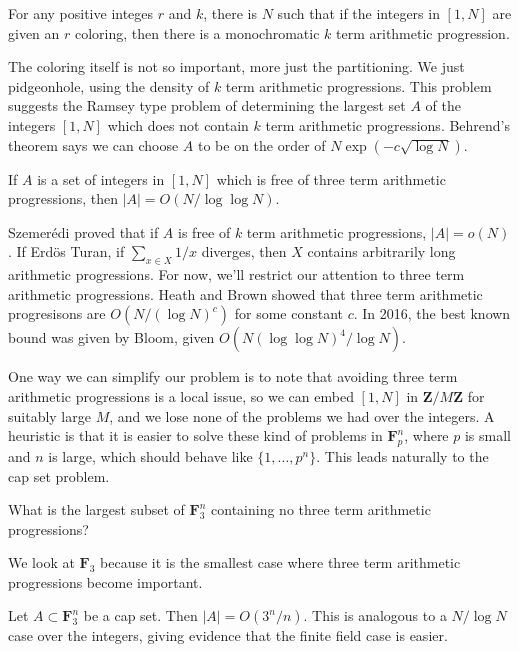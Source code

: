 \begin{theorem}
	For any positive integes $r$ and $k$, there is $N$ such that if the integers in $[1,N]$ are given an $r$ coloring, then there is a monochromatic $k$ term arithmetic progression.
\end{theorem}

The coloring itself is not so important, more just the partitioning. We just pidgeonhole, using the density of $k$ term arithmetic progressions. This problem suggests the Ramsey type problem of determining the largest set $A$ of the integers $[1,N]$ which does not contain $k$ term arithmetic progressions. Behrend's theorem says we can choose $A$ to be on the order of $N\exp(-c \sqrt{\log N})$.

\begin{theorem}[Roth - 1956] If $A$ is a set of integers in $[1,N]$ which is free of three term arithmetic progressions, then $|A| = O(N/\log \log N)$.
\end{theorem}

Szemer\'{e}di proved that if $A$ is free of $k$ term arithmetic progressions, $|A| = o(N)$. If Erd\"{o}s Turan, if $\sum_{x \in X} 1/x$ diverges, then $X$ contains arbitrarily long arithmetic progressions. For now, we'll restrict our attention to three term arithmetic progressions. Heath and Brown showed that three term arithmetic progresisons are $O(N/(\log N)^c)$ for some constant $c$. In 2016, the best known bound was given by Bloom, given $O(N(\log \log N)^4/\log N)$.

One way we can simplify our problem is to note that avoiding three term arithmetic progressions is a local issue, so we can embed $[1,N]$ in $\mathbf{Z}/M\mathbf{Z}$ for suitably large $M$, and we lose none of the problems we had over the integers. A heuristic is that it is easier to solve these kind of problems in $\mathbf{F}_p^n$, where $p$ is small and $n$ is large, which should behave like $\{ 1, \dots, p^n \}$. This leads naturally to the cap set problem.

\begin{theorem}
	What is the largest subset of $\mathbf{F}_3^n$ containing no three term arithmetic progressions?
\end{theorem}

We look at $\mathbf{F}_3$ because it is the smallest case where three term arithmetic progressions become important.

\begin{theorem}[Meschulam - 1995]
	Let $A \subset \mathbf{F}_3^n$ be a cap set. Then $|A| = O(3^n/n)$. This is analogous to a $N/\log N$ case over the integers, giving evidence that the finite field case is easier.
\end{theorem}


